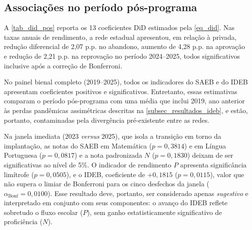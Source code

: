 \subsection{Associações no período pós-programa}
\label{subsec_did_pos}

A \autoref{tab_did_pos} reporta os 13 coeficientes DiD estimados pela \autoref{eq_did}.
Nas taxas anuais de rendimento, a rede estadual apresentou, em relação à privada, redução diferencial de 2,07 p.p. no abandono, aumento de 4,28 p.p. na aprovação e redução de 2,21 p.p. na reprovação no período 2024--2025, todos significativos inclusive após a correção de Bonferroni.

No painel bienal completo (2019--2025), todos os indicadores do SAEB e do IDEB apresentam coeficientes positivos e significativos.
Entretanto, essas estimativas comparam o período pós-programa com uma média que inclui 2019, ano anterior às perdas pandêmicas assimétricas descritas na \autoref{subsec_resultados_ideb}, e estão, portanto, contaminadas pela divergência pré-existente entre as redes.

Na janela imediata (2023 \textit{versus} 2025), que isola a transição em torno da implantação, as notas do SAEB em Matemática ($p = 0{,}3814$) e em Língua Portuguesa ($p = 0{,}0817$) e a nota padronizada $N$ ($p = 0{,}1830$) deixam de ser significativas ao nível de 5\%.
O indicador de rendimento $P$ apresenta significância limítrofe ($p = 0{,}0505$), e o IDEB, coeficiente de $+0{,}1815$ ($p = 0{,}0115$), valor que não supera o limiar de Bonferroni para os cinco desfechos da janela ($\alpha_{\text{Bonf}} = 0{,}0100$).
Esse resultado deve, portanto, ser considerado apenas \textit{sugestivo} e interpretado em conjunto com seus componentes: o avanço do IDEB reflete sobretudo o fluxo escolar ($P$), sem ganho estatisticamente significativo de proficiência ($N$).

